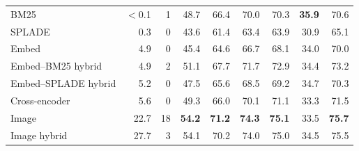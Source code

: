 \begin{table}[t]
\begin{tabular*}{\linewidth}{@{\extracolsep{\fill}}lrrrrrrrr@{}}
\midrule
BM25 & $<$0.1 & 1 & 48.7 & 66.4 & 70.0 & 70.3 & \textbf{35.9} & 70.6 \\
SPLADE & 0.3 & 0 & 43.6 & 61.4 & 63.4 & 63.9 & 30.9 & 65.1 \\
Embed & 4.9 & 0 & 45.4 & 64.6 & 66.7 & 68.1 & 34.0 & 70.0 \\
Embed--BM25 hybrid & 4.9 & 2 & 51.1 & 67.7 & 71.7 & 72.9 & 34.4 & 73.2 \\
Embed--SPLADE hybrid & 5.2 & 0 & 47.5 & 65.6 & 68.5 & 69.2 & 34.7 & 70.3 \\
Cross-encoder & 5.6 & 0 & 49.3 & 66.0 & 70.1 & 71.1 & 33.3 & 71.5 \\
Image & 22.7 & 18 & \textbf{54.2} & \textbf{71.2} & \textbf{74.3} & \textbf{75.1} & 33.5 & \textbf{75.7} \\
Image hybrid & 27.7 & 3 & 54.1 & 70.2 & 74.0 & 75.0 & 34.5 & 75.5 \\
\bottomrule
\end{tabular*}
\end{table}

